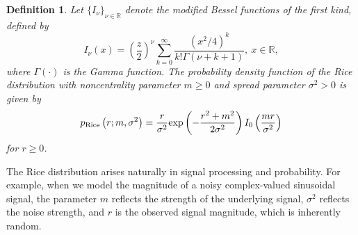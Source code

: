 \documentclass{amsart}
\newtheorem{Definition}{Definition}
\begin{document}
\begin{Definition}
Let $\{I_{\nu}\}_{\nu\in \mathbb{R}}$ denote the modified Bessel functions of the first kind,
defined by
\begin{equation}\label{def:;Bessel}
I_{\nu}(x) = \left(\frac{z}{2}\right)^{\nu} \overset{\infty}{\underset{k=0}{\sum}}\frac{(x^{2}/4)^{k}}{k!\Gamma(\nu+k+1)},\ x\in \mathbb{R},
\end{equation}
where $\Gamma(\cdot)$ is the Gamma function.
The probability density function of the Rice distribution \cite{miller1964multidimensional} with noncentrality parameter $m\geq0$ and spread parameter $\sigma^{2}>0$ is given by
\begin{align}\label{def:rice}
p_{\textup{Rice}}\left(r;m,\sigma^{2}\right) = \frac{r}{\sigma^{2}}
\textup{exp}\left(-\frac{r^2+m^{2}}{2\sigma^{2}}\right)
I_{0}\left(\frac{mr}{\sigma^{2}}\right)
\end{align}
for $r\geq 0$.
\end{Definition}


The Rice distribution arises naturally in signal processing and probability. For example, when we model the magnitude of a noisy complex-valued sinusoidal signal, the parameter $m$ reflects the strength of the underlying signal, $\sigma^2$ reflects the noise strength, and $r$ is the observed signal magnitude, which is inherently random.
\end{document}
